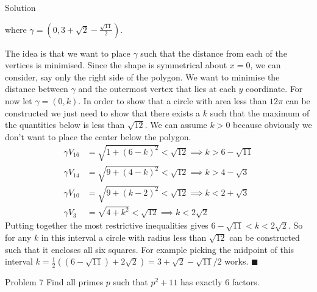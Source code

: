 \documentclass{article}
\begin{document}
\begin{solution}{Solution}
\begin{center}
\begin{asy}
\end{asy}
\end{center}
where $\gamma = \left(0, 3+\sqrt2 - \frac{\sqrt{11}}{2}\right)$.
\vspace{0.2cm}

The
idea is that we want to place $\gamma$ such that the distance from each
of the vertices is minimised. Since the shape is symmetrical about $x=0$,
we can consider, say only the right side of the polygon. We want to minimise
the distance between $\gamma$ and the outermost vertex that lies at each
$y$ coordinate. For now let $\gamma = (0, k)$. In order to show that
a circle with area less than $12 \pi$ can be constructed we just need to
show that there exists a $k$ such that the maximum of the quantities below
is less than $\sqrt{12}$. We can assume $k > 0$ because obviously we don't
want to place the center below the polygon.
\[
\begin{aligned}
\gamma V_{16} &= \sqrt{1 + (6-k)^2} < \sqrt{12} \implies k > 6-\sqrt{11} \\
\gamma V_{14} &= \sqrt{9 + (4-k)^2} < \sqrt{12} \implies k > 4-\sqrt{3}\\
\gamma V_{10} &= \sqrt{9 + (k-2)^2} < \sqrt{12} \implies k < 2+\sqrt{3}\\
\gamma V_3 &= \sqrt{4 + k^2} < \sqrt{12} \implies k < 2\sqrt{2}
\end{aligned}
\]
Putting together the most restrictive inequalities gives
$6-\sqrt{11} < k < 2\sqrt{2}$. So for any $k$ in this interval a circle
with radius less than $\sqrt{12}$ can be constructed such that it encloses
all six squares. For example picking the midpoint of this interval
$k = \frac12((6-\sqrt{11})+2\sqrt2) =
3 + \sqrt{2} - \sqrt{11}/2$
works. $\blacksquare$
\end{solution}
\newpage

\begin{problem}{Problem 7}
Find all primes $p$ such that $p^2 + 11$ has exactly 6 factors.
\end{problem}
\end{document}
